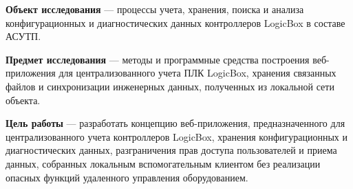 \textbf{Объект исследования} --- процессы учета, хранения, поиска и анализа
конфигурационных и диагностических данных контроллеров LogicBox в составе АСУТП.

\textbf{Предмет исследования} --- методы и программные средства построения
веб-приложения для централизованного учета ПЛК LogicBox, хранения связанных
файлов и синхронизации инженерных данных, полученных из локальной сети объекта.

\textbf{Цель работы} --- разработать концепцию веб-приложения, предназначенного
для централизованного учета контроллеров LogicBox, хранения конфигурационных и
диагностических данных, разграничения прав доступа пользователей и приема данных,
собранных локальным вспомогательным клиентом без реализации опасных функций
удаленного управления оборудованием.

